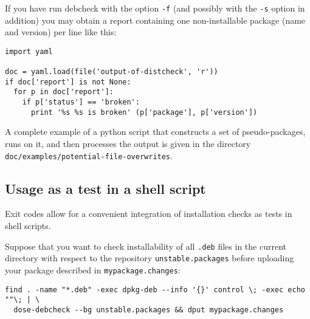 \begin{example}
  If you have run debcheck with the option \texttt{-f} (and possibly
  with the \texttt{-s} option in addition) you may obtain a report
  containing one non-installable package (name and version) per line
  like this:
  
\begin{verbatim}
import yaml

doc = yaml.load(file('output-of-distcheck', 'r'))
if doc['report'] is not None:
  for p in doc['report']:
    if p['status'] == 'broken':
      print '%s %s is broken' (p['package'], p['version'])
\end{verbatim}
\end{example}

A complete example of a python script that constructs a set of
pseudo-packages, runs \debcheck{} on it, and then processes the output
is given in the directory
\texttt{doc/examples/potential-file-overwrites}.

\subsection{Usage as a test in a shell script}
Exit codes allow for a convenient integration of installation checks
as tests in shell scripts.

\begin{example}
Suppose that you want to check installability of all \verb|.deb| files
in the current directory with respect to the repository
\verb|unstable.packages| before uploading your package described in
\verb|mypackage.changes|:

\begin{verbatim}
find . -name "*.deb" -exec dpkg-deb --info '{}' control \; -exec echo ""\; | \
  dose-debcheck --bg unstable.packages && dput mypackage.changes
\end{verbatim}
\end{example}

